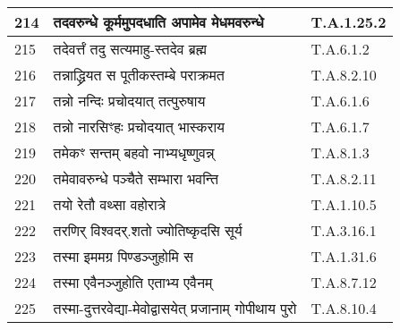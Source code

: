 \documentclass[17pt]{extarticle}
\begin{document}
\begin{longtable}{||p{0.4in}||p{4.9in}||p{0.9in}||}
    \hline
        
    214 & तदवरुन्धे कूर्ममुपदधाति अपामेव मेधमवरुन्धे & T.A.1.25.2       \\
    
    \hline
        
    215 & तदेवर्त्तं तदु सत्यमाहु{-}स्तदेव ब्रह्म & T.A.6.1.2       \\
    
    \hline
        
    216 & तन्नाद्ध्रियत स पूतीकस्तम्बे पराक्रमत & T.A.8.2.10       \\
    
    \hline
        
    217 & तन्नो नन्दिः प्रचोदयात् तत्पुरुषाय & T.A.6.1.6       \\
    
    \hline
        
    218 & तन्नो नारसिꣳहः प्रचोदयात् भास्कराय & T.A.6.1.7       \\
    
    \hline
        
    219 & तमेकꣳ सन्तम् बहवो नाभ्यधृष्णुवन्न् & T.A.8.1.3       \\
    
    \hline
        
    220 & तमेवावरुन्धे पञ्चैते सम्भारा भवन्ति & T.A.8.2.11       \\
    
    \hline
        
    221 & तयो रेतौ वथ्सा वहोरात्रे & T.A.1.10.5       \\
    
    \hline
        
    222 & तरणिर् विश्वदर्.शतो ज्योतिष्कृदसि सूर्य & T.A.3.16.1       \\
    
    \hline
        
    223 & तस्मा इममग्र पिण्डञ्जुहोमि स & T.A.1.31.6       \\
    
    \hline
        
    224 & तस्मा एवैनञ्जुहोति एताभ्य एवैनम् & T.A.8.7.12       \\
    
    \hline
        
    225 & तस्मा{-}दुत्तरवेद्या{-}मेवोद्वासयेत् प्रजानाम् गोपीथाय पुरो & T.A.8.10.4       \\
    
    \hline
        

\end{longtable}
\end{document}
